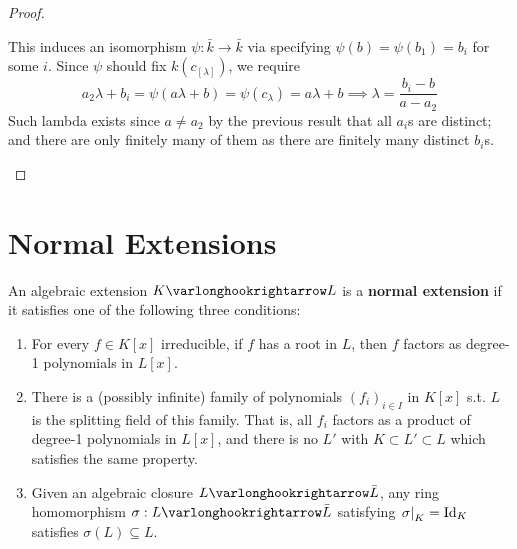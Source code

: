 \begin{proof}
\begin{itemize}
        \begin{minipage}{\linewidth}
            \centering
        \end{minipage}
        This induces an isomorphism $\psi: \bar{k} \to \bar{k}$ via specifying $\psi(b) = \psi(b_1) = b_i$ for some $i$. Since $\psi$ should fix $k(c_[\lambda])$, we require
        \[
            a_2 \lambda + b_i = \psi(a \lambda + b) = \psi(c_{\lambda}) = a \lambda + b \implies \lambda = \frac{b_i - b}{a - a_2}
        \]
        Such lambda exists since $a \neq a_2$ by the previous result that all $a_i$s are distinct; and there are only finitely many of them as there are finitely many distinct $b_i$s.
    \end{itemize}
\end{proof}

\section{Normal Extensions}

\begin{definition}\label{def: normal extension}
    An algebraic extension $K \ext L$ is a \textbf{normal extension} if it satisfies one of the following three conditions:
    \begin{enumerate}[label=\arabic*)]
        \item For every $f \in K[x]$ irreducible, if $f$ has a root in $L$, then $f$ factors as degree-1 polynomials in $L[x]$.
        \item There is a (possibly infinite) family of polynomials $(f_i)_{i \in I}$ in $K[x]$ s.t. $L$ is the splitting field of this family. That is, all $f_i$ factors as a product of degree-1 polynomials in $L[x]$, and there is no $L'$ with $K \subset L' \subset L$ which satisfies the same property. 
        \item Given an algebraic closure $L \ext \bar{L}$, any ring homomorphism $\sigma: L \ext \bar{L}$ satisfying $\left.\sigma\right|_{K} = \mathrm{Id}_K$ satisfies $\sigma(L) \subseteq L$.
    \end{enumerate}
\end{definition}

